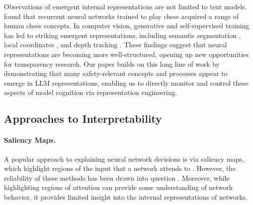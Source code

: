 Observations of emergent internal representations are not limited to text models. \cite{mcgrath2022acquisition} found that recurrent neural networks trained to play chess acquired a range of human chess concepts. In computer vision, generative and self-supervised training has led to striking emergent representations, including semantic segmentation \citep{caron2021emerging, oquab2023dinov2}, local coordinates \citep{karras2021alias}, and depth tracking \citep{chen2023surface}. These findings suggest that neural representations are becoming more well-structured, opening up new opportunities for transparency research. Our paper builds on this long line of work by demonstrating that many safety-relevant concepts and processes appear to emerge in LLM representations, enabling us to directly monitor and control these aspects of model cognition via representation engineering.

















\subsection{Approaches to Interpretability}

\paragraph{Saliency Maps.} A popular approach to explaining neural network decisions is via saliency maps, which highlight regions of the input that a network attends to \citep{simonyan2013deep, springenberg2014striving, zeiler2014visualizing, zhou2016learning, smilkov2017smoothgrad, sundararajan2017axiomatic, selvaraju2017grad, lei2016rationalizing, clark-etal-2019-bert}. However, the reliability of these methods has been drawn into question \citep{adebayo2018sanity, kindermans2019reliability, jain-wallace-2019-attention, bilodeau2022impossibility}. Moreover, while highlighting regions of attention can provide some understanding of network behavior, it provides limited insight into the internal representations of networks.



